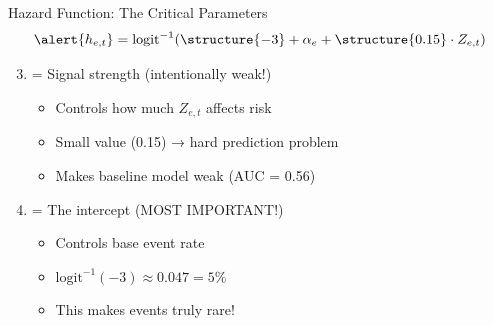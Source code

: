 \documentclass[aspectratio=169]{beamer}
\begin{document}
\begin{frame}{Hazard Function: The Critical Parameters}
\[\alert{h_{e,t}} = \text{logit}^{-1}(\structure{-3} + \alpha_e + \structure{0.15} \cdot Z_{e,t})\]

\begin{enumerate}
\setcounter{enumi}{2}
\item {} = Signal strength (intentionally weak!)
\begin{itemize}
\item Controls how much $Z_{e,t}$ affects risk
\item Small value (0.15) → hard prediction problem
\item Makes baseline model weak (AUC = 0.56)
\end{itemize}

\vspace{0.3em}
\item {} = \alert{The intercept (MOST IMPORTANT!)}
\begin{itemize}
\item Controls base event rate
\item $\text{logit}^{-1}(-3) \approx 0.047 = 5\%$
\item \alert{This makes events truly rare!}
\end{itemize}
\end{enumerate}

\vspace{0.5em}
\begin{center}
\end{center}
\end{frame}
\end{document}
